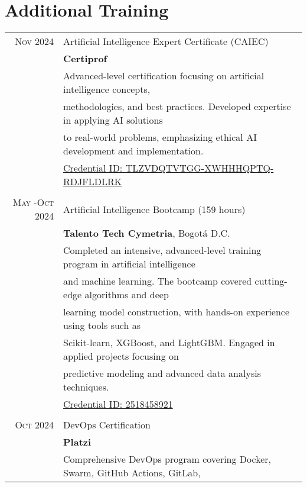 \documentclass[a4paper,10pt]{article} %
\begin{document}
\vspace{1em}
\section{Additional Training}
\begin{tabular}{r|l}
\textsc{Nov} 2024 & Artificial Intelligence Expert Certificate (CAIEC)\\
& \normalsize\textbf{Certiprof}\\
& \small Advanced-level certification focusing on artificial intelligence concepts,\\
& \small methodologies, and best practices. Developed expertise in applying AI solutions\\
& \small to real-world problems, emphasizing ethical AI development and implementation.\\
& \small \href{https://www.credly.com/badges/TLZVDQTVTGG-XWHHHQPTQ-RDJFLDLRK}{Credential ID: TLZVDQTVTGG-XWHHHQPTQ-RDJFLDLRK}\\
\\
\textsc{May} -\textsc{Oct} 2024 & Artificial Intelligence Bootcamp (159 hours)\\
& \normalsize\textbf{Talento Tech Cymetria}, Bogotá D.C.\\
& \small Completed an intensive, advanced-level training program in artificial intelligence\\
& \small and machine learning. The bootcamp covered cutting-edge algorithms and deep\\
& \small learning model construction, with hands-on experience using tools such as\\
& \small Scikit-learn, XGBoost, and LightGBM. Engaged in applied projects focusing on\\
& \small predictive modeling and advanced data analysis techniques.\\
& \small \href{https://certificados.talentotech.co/?cert=2518458921#pdf}{Credential ID: 2518458921}\\
\\
\textsc{Oct} 2024 & DevOps Certification\\
& \normalsize\textbf{Platzi}\\
& \small Comprehensive DevOps program covering Docker, Swarm, GitHub Actions, GitLab,\\

\end{tabular}
\end{document}
